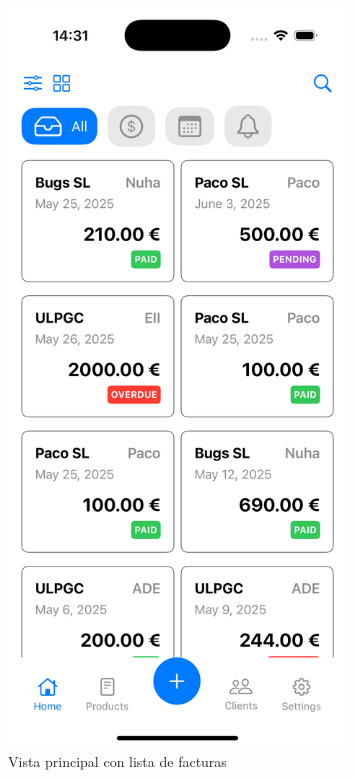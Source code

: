 \begin{large}
\begin{figure}[H]
\begin{minipage}[t]{0.45\textwidth}
    \includegraphics[width=0.8\textwidth]{Ilustraciones/ios_homeview.png}
    \caption{Vista principal con lista de facturas}
    \label{fig:home_view}
  \end{minipage}
\end{figure}


\end{large}
